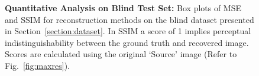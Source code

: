 \begin{figure}[t!]
		\vspace{-.25in}
	\centering
	\caption{\footnotesize{ {\bf Quantitative Analysis on Blind Test Set:}  Box plots of MSE and SSIM for reconstruction methods on the blind dataset presented in Section~\ref{section:dataset}. 
			In SSIM a score of 1 implies perceptual indistinguishability between the ground truth and recovered image. Scores are calculated using the original `Source' image (Refer to Fig.~\ref{fig:maxres}). 
		}}
	\label{fig:resultnums}
	\vspace{-0.23in}
\end{figure}


